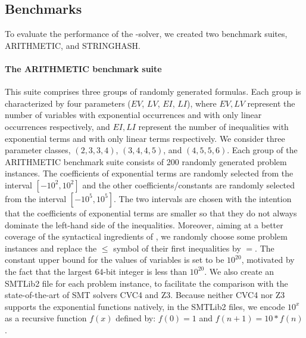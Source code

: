 \subsection{Benchmarks}

To evaluate the performance of the {\paexp}-solver, we created two benchmark suites, ARITHMETIC, and STRINGHASH.

\paragraph{The ARITHMETIC benchmark suite} 
This suite comprises three groups of randomly generated {\paexp} formulas. Each group is characterized by four parameters ($EV$, $LV$, $EI$, $LI$), where $EV, LV$ represent the number of variables with exponential occurrences and with only linear occurrences respectively, and $EI, LI$ represent the number of inequalities with exponential terms and with only linear terms respectively. 
We consider three parameter classes, $(2, 3, 3, 4)$, $(3, 4, 4, 5)$, and $(4, 5, 5, 6)$. 
Each group of the ARITHMETIC benchmark suite consists of 200 randomly generated problem instances. The coefficients of exponential terms are randomly selected from the interval $[-10^2, 10^2]$ and the other coefficients/constants are randomly selected from the interval $[-10^5, 10^5]$. The two intervals are chosen with the intention that the coefficients of exponential terms are smaller so that they do not always dominate the left-hand side of the inequalities. Moreover, aiming at a better coverage of the syntactical ingredients of {\paexp}, we randomly choose some problem instances and replace the $\le$ symbol of their first inequalities by $=$. The constant upper bound for the values of variables is set to be $10^{20}$, motivated by the fact that the largest 64-bit integer is less than $10^{20}$. We also create an SMTLib2 file for each problem instance, to facilitate the comparison with the state-of-the-art of SMT solvers CVC4 and Z3. Because neither CVC4 nor Z3 supports the exponential functions natively, in the SMTLib2 files, we encode $10^x$ as a recursive function $f(x)$ defined by: $f(0) = 1$ and $f(n+1) = 10*f(n)$.

%

